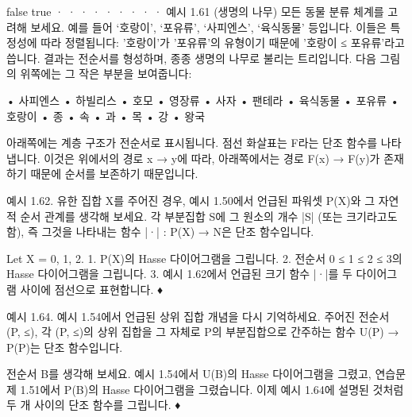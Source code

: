 \documentclass[11pt, a4paper, twoside, openany]{book}
\begin{document}
\par\medskip
false
true
· · ·
· · ·
· · ·
예시 1.61 (생명의 나무) 모든 동물 분류 체계를 고려해 보세요. 예를 들어 ‘호랑이’, ‘포유류’, ‘사피엔스’, ‘육식동물’ 등입니다. 이들은 특정성에 따라 정렬됩니다: '호랑이'가 '포유류'의 유형이기 때문에 '호랑이 ≤ 포유류'라고 씁니다. 결과는 전순서를 형성하며, 종종 생명의 나무로 불리는 트리입니다. 다음 그림의 위쪽에는 그 작은 부분을 보여줍니다:

\par\medskip
•
사피엔스
•
하빌리스
•
호모
•
영장류
•
사자
•
팬테라
•
육식동물
•
포유류
•
호랑이
•
종
•
속
•
과
•
목
•
강
•
왕국

\par\medskip
아래쪽에는 계층 구조가 전순서로 표시됩니다. 점선 화살표는 F\hspace{0pt}라는 단조 함수를 나타냅니다. 이것은 위에서의 경로 x → y\hspace{0pt}에 따라, 아래쪽에서는 경로 F(x) → F(y)가 존재하기 때문에 순서를 보존하기 때문입니다.

\par\medskip
예시 1.62. 유한 집합 X\hspace{0pt}를 주어진 경우, 예시 1.50\hspace{0pt}에서 언급된 파워셋 P(X)와 그 자연적 순서 관계를 생각해 보세요. 각 부분집합 S\hspace{0pt}에 그 원소의 개수 |S| (또는 크기라고도 함), 즉 그것을 나타내는 함수 |·| : P(X) → N\hspace{0pt}은 단조 함수입니다.

\par\medskip
\begin{exercisebox}[연습문제 1.63.]
Let X = {0, 1, 2}.
1. P(X)의 Hasse 다이어그램을 그립니다.
2. 전순서 0 ≤ 1 ≤ 2 ≤ 3\hspace{0pt}의 Hasse 다이어그램을 그립니다.
3. 예시 1.62\hspace{0pt}에서 언급된 크기 함수 |·|를 두 다이어그램 사이에 점선으로 표현합니다.
♦
\end{exercisebox}

\par\medskip
예시 1.64. 예시 1.54\hspace{0pt}에서 언급된 상위 집합 개념을 다시 기억하세요. 주어진 전순서 (P, ≤), 각 (P, ≤)의 상위 집합을 그 자체로 P\hspace{0pt}의 부분집합으로 간주하는 함수 U(P) → P(P)는 단조 함수입니다.

\par\medskip
\begin{exercisebox}[연습문제 1.65.]
전순서 B\hspace{0pt}를 생각해 보세요. 예시 1.54\hspace{0pt}에서 U(B)의 Hasse 다이어그램을 그렸고, 연습문제 1.51\hspace{0pt}에서 P(B)의 Hasse 다이어그램을 그렸습니다. 이제 예시 1.64\hspace{0pt}에 설명된 것처럼 두 개 사이의 단조 함수를 그립니다.
♦
\end{exercisebox}
\end{document}

